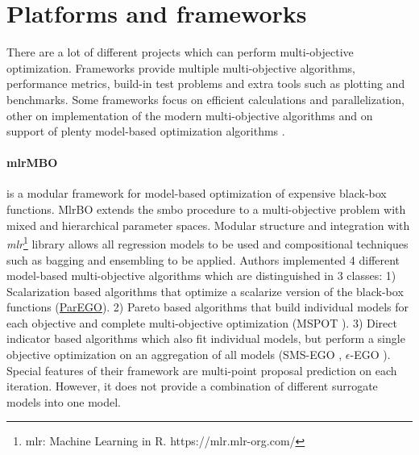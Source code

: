 

    \section{Platforms and frameworks}
        There are a lot of different projects which can perform multi-objective optimization. Frameworks provide multiple multi-objective algorithms, performance metrics, build-in test problems and extra tools such as plotting and benchmarks. Some frameworks focus on efficient calculations and parallelization\cite{francesco_biscani_2019}, other on implementation of the modern multi-objective algorithms \cite{benitezhidalgo2019jmetalpy, TianPlatEMO} and on support of plenty model-based optimization algorithms \cite{BischlmlrMBO}.

        \paragraph{mlrMBO}\cite{BischlmlrMBO} is a modular framework for model-based optimization of expensive black-box functions. MlrBO extends the \gls{smbo} procedure to a multi-objective problem with mixed and hierarchical parameter spaces. Modular structure and integration with \emph{mlr}\footnote{{mlr}: Machine Learning in R. https://mlr.mlr-org.com/} library allows all regression models to be used and compositional techniques such as bagging and ensembling to be applied. Authors implemented 4 different model-based multi-objective algorithms which are distinguished in 3 classes: 1) Scalarization based algorithms that optimize a scalarize version of the black-box functions (\hyperref[alg:ParEGO]{ParEGO}). 2) Pareto based algorithms that build individual models for each objective and complete multi-objective optimization (MSPOT \cite{ZaeffererBNWE13}). 3) Direct indicator based algorithms which also fit individual models, but perform a single objective optimization on an aggregation of all models (SMS-EGO \cite{inproceedings}, $\epsilon$-EGO \cite{WagEGOe}).
        Special features of their framework are multi-point proposal prediction on each iteration. However, it does not provide a combination of different surrogate models into one model.
       
